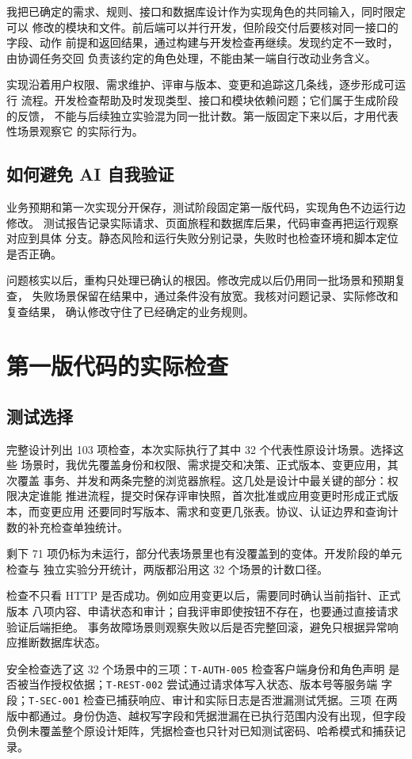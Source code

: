 \documentclass[UTF8,a4paper,12pt]{ctexart}
\newcommand{\code}[1]{\allowbreak\nolinkurl{#1}\allowbreak}
\newcommand{\chapterbreak}{\par\bigskip}
\begin{document}
我把已确定的需求、规则、接口和数据库设计作为实现角色的共同输入，同时限定可以
修改的模块和文件。前后端可以并行开发，但阶段交付后要核对同一接口的字段、动作
前提和返回结果，通过构建与开发检查再继续。发现约定不一致时，由协调任务交回
负责该约定的角色处理，不能由某一端自行改动业务含义。

实现沿着用户权限、需求维护、评审与版本、变更和追踪这几条线，逐步形成可运行
流程。开发检查帮助及时发现类型、接口和模块依赖问题；它们属于生成阶段的反馈，
不能与后续独立实验混为同一批计数。第一版固定下来以后，才用代表性场景观察它
的实际行为。

\subsection{如何避免 AI 自我验证}
业务预期和第一次实现分开保存，测试阶段固定第一版代码，实现角色不边运行边修改。
测试报告记录实际请求、页面旅程和数据库后果，代码审查再把运行观察对应到具体
分支。静态风险和运行失败分别记录，失败时也检查环境和脚本定位是否正确。

问题核实以后，重构只处理已确认的根因。修改完成以后仍用同一批场景和预期复查，
失败场景保留在结果中，通过条件没有放宽。我核对问题记录、实际修改和复查结果，
确认修改守住了已经确定的业务规则。

\chapterbreak
\section{第一版代码的实际检查}
\subsection{测试选择}
完整设计列出 103 项检查，本次实际执行了其中 32 个代表性原设计场景。选择这些
场景时，我优先覆盖身份和权限、需求提交和决策、正式版本、变更应用，其次覆盖
事务、并发和两条完整的浏览器旅程。这几处是设计中最关键的部分：权限决定谁能
推进流程，提交时保存评审快照，首次批准或应用变更时形成正式版本，而变更应用
还要同时写版本、需求和变更几张表。协议、认证边界和查询计数的补充检查单独统计。

剩下 71 项仍标为未运行，部分代表场景里也有没覆盖到的变体。开发阶段的单元检查与
独立实验分开统计，两版都沿用这 32 个场景的计数口径。

检查不只看 HTTP 是否成功。例如应用变更以后，需要同时确认当前指针、正式版本
八项内容、申请状态和审计；自我评审即使按钮不存在，也要通过直接请求验证后端拒绝。
事务故障场景则观察失败以后是否完整回滚，避免只根据异常响应推断数据库状态。

安全检查选了这 32 个场景中的三项：\code{T-AUTH-005} 检查客户端身份和角色声明
是否被当作授权依据；\code{T-REST-002} 尝试通过请求体写入状态、版本号等服务端
字段；\code{T-SEC-001} 检查已捕获响应、审计和实际日志是否泄漏测试凭据。三项
在两版中都通过。身份伪造、越权写字段和凭据泄漏在已执行范围内没有出现，但字段
负例未覆盖整个原设计矩阵，凭据检查也只针对已知测试密码、哈希模式和捕获记录。
\end{document}
